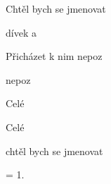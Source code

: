 

\zs
Chtěl bych se jmenovat 

 dívek a 

Přicházet k nim nepoz

 nepoz
\ks

\zr
Celé      

Celé      

chtěl bych se jmenovat 
\kr

\zs
= 1. 
\ks

\kp
